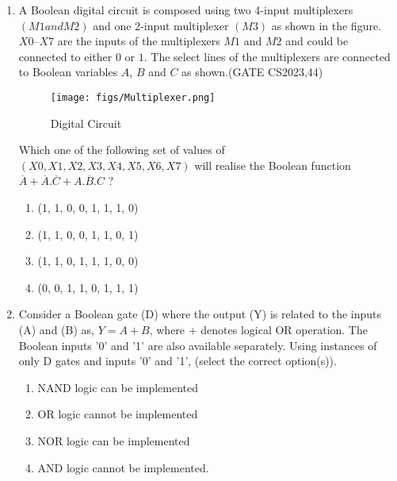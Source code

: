 \begin{enumerate}
\item A Boolean digital circuit is composed using two 4-input multiplexers $(M1 and M2)$ and one 2-input multiplexer $(M3)$ as shown in the figure. $X0$–$X7$ are the inputs of the multiplexers $M1$ and $M2$ and could be connected to either $0$ or $1$. The select lines of the multiplexers are connected to Boolean variables $A$, $B$ and $C$ as shown.\hfill(GATE CS2023,44)

\begin{figure}[H]
    \centering
        \texttt{[image: figs/Multiplexer.png]}
    \caption{Digital Circuit}
    \label{fig:Multiplexer}
\end{figure}

Which one of the following set of values of $(X0, X1, X2, X3, X4, X5, X6, X7)$ will realise the Boolean function 
$\overline{A} + \overline{A}.\overline{C}+A.\overline{B}.C $ ?
 \begin{enumerate}
     \item (1, 1, 0, 0, 1, 1, 1, 0)
     \item (1, 1, 0, 0, 1, 1, 0, 1)
     \item (1, 1, 0, 1, 1, 1, 0, 0)
     \item (0, 0, 1, 1, 0, 1, 1, 1)
 \end{enumerate}

\item
\label{prob:2022-gate-EC-49}
Consider a Boolean gate (D) where the output (Y) is related to the inputs (A) and (B) as, $Y = A + B$, where + denotes logical OR operation. The Boolean inputs '0' and '1' are also available separately. Using instances of only D gates and inputs '0' and '1', (select the correct option(s)).
\begin{enumerate}
\item  NAND logic can be implemented

\item  OR logic cannot be implemented

\item  NOR logic can be implemented

\item  AND logic cannot be implemented.
\end{enumerate}

\end{enumerate}
